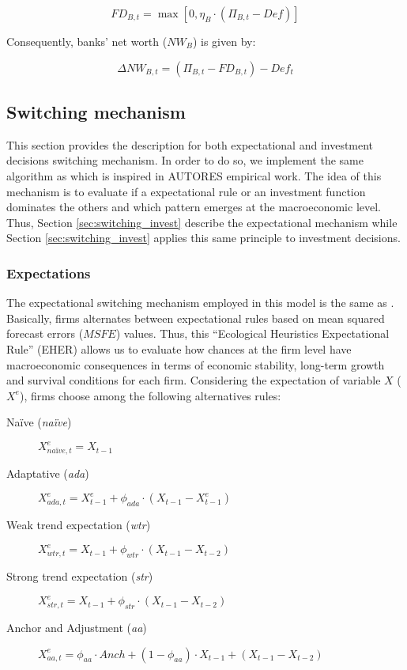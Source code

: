 \documentclass{SelfArx}
\begin{document}
\begin{latex}
\begin{equation}
FD_{B,t} = \max [0, \eta_{B}\cdot(\Pi_{B,t} - Def)]
\end{equation}
\end{latex}
Consequently, banks' net worth (\(NW_{B}\)) is given by:
\begin{latex}
\begin{equation}
\Delta NW_{B,t} = (\Pi_{B,t} - FD_{B,t}) - Def_{t}
\end{equation}
\end{latex}

\subsection{Switching mechanism}
\label{sec:switching}
This section provides the description for both expectational and investment decisions switching mechanism.
In order to do so, we implement the same algorithm as \textcite{dosi_2020_RATIONAL,reissl_2021_Heterogeneousa} which is inspired in AUTORES empirical work.
The idea of this mechanism is to evaluate if a expectational rule or an investment function dominates the others and which pattern emerges at the macroeconomic level.
Thus, Section \ref{sec:switching_invest} describe the expectational mechanism while Section \ref{sec:switching_invest} applies this same principle to investment decisions.

\subsubsection{Expectations}
\label{sec:switching_expec}
The expectational switching mechanism employed in this model is the same as \textcite{dosi_2020_RATIONAL,reissl_2021_Heterogeneousa}.
Basically, firms alternates between expectational rules based on mean squared forecast errors (\(MSFE\)) values.
Thus, this ``Ecological Heuristics Expectational Rule'' (EHER) allows us to evaluate how chances at the firm level have macroeconomic consequences in terms of economic stability, long-term growth and survival conditions for each firm.
Considering the expectation of variable \(X\) (\(X^{e}\)), firms choose among the following alternatives rules:

\begin{description}
\item[{Naïve (\emph{naïve})}] \(X^{e}_{na\text{\"{i}}ve,t} = X_{t-1}\)
\item[{Adaptative (\emph{ada})}] \(X^{e}_{ada,t} = X^{e}_{t-1} + \phi_{ada}\cdot (X_{t-1} - X^{e}_{t-1})\)
\item[{Weak trend expectation (\emph{wtr})}] \(X^{e}_{wtr,t} = X_{t-1} + \phi_{wtr}\cdot (X_{t-1} - X_{t-2})\)
\item[{Strong trend expectation (\emph{str})}] \(X^{e}_{str,t} = X_{t-1} + \phi_{str}\cdot (X_{t-1} - X_{t-2})\)
\item[{Anchor and Adjustment (\emph{aa})}] \(X^{e}_{aa,t} = \phi_{aa}\cdot Anch + (1-\phi_{aa})\cdot X_{t-1} + (X_{t-1} - X_{t-2})\)
\end{description}
\end{document}
